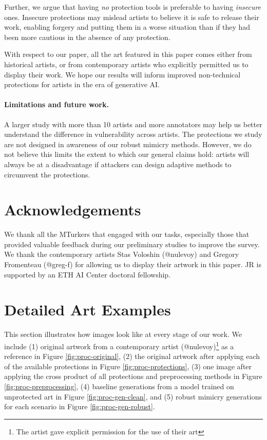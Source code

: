\documentclass{article}
\begin{document}
Further, we argue that having \emph{no} protection tools is preferable to having \emph{insecure} ones. Insecure protections may mislead artists to believe it is safe to release their work, enabling forgery and putting them in a worse situation than if they had been more cautious in the absence of any protection.


With respect to our paper, all the art featured in this paper comes either from historical artists, or from contemporary artists who explicitly permitted us to display their work. We hope our results will inform improved non-technical protections for artists in the era of generative AI.

\paragraph{Limitations and future work.} 
A larger study with more than 10 artists and more annotators may help us better understand the difference in vulnerability across artists.
The protections we study are not designed in awareness of our robust mimicry methods. However, we do not believe this limits the extent to which our general claims hold: artists will always be at a disadvantage if attackers can design adaptive methods to circumvent the protections.





\section*{Acknowledgements}
We thank all the MTurkers that engaged with our tasks, especially those that provided valuable feedback during our preliminary studies to improve the survey. We thank the contemporary artists Stas Voloshin (@nulevoy) and Gregory Fromenteau (@greg-f) for allowing us to display their artwork in this paper. JR is supported by an ETH AI Center doctoral fellowship.

\clearpage



\newpage
\clearpage
\appendix

\clearpage
\section{Detailed Art Examples}
\label{ap:examples}

This section illustrates how images look like at every stage of our work. We include (1) original artwork from a contemporary artist (@nulevoy)\footnote{The artist gave explicit permission for the use of their art} as a reference in Figure \ref{fig:proc-original}, (2) the original artwork after applying each of the available protections in Figure \ref{fig:proc-protections}, (3) one image after applying the cross product of all protections and preprocessing methods in Figure \ref{fig:proc-preprocessing}, (4) baseline generations from a model trained on unprotected art in Figure \ref{fig:proc-gen-clean}, and (5) robust mimicry generations for each scenario in Figure \ref{fig:proc-gen-robust}.
\end{document}
